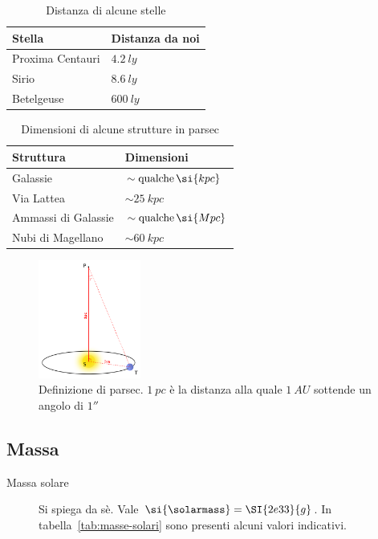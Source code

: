 \begin{table}
\caption{Distanza di alcune stelle}
\label{tab:distanze-stelle}
\centering
\begin{tabular}{ll}
\toprule
Stella & Distanza da noi  \\
\midrule
Proxima Centauri & $\SI{4.2}{ly}$ \\
Sirio            & $\SI{8.6}{ly}$ \\
Betelgeuse       & $\SI{600}{ly}$ \\
\bottomrule
\end{tabular}
\end{table}

\begin{table}
\caption{Dimensioni di alcune strutture in parsec}
\label{tab:distanze-parsec}
\centering
\begin{tabular}{ll}
\toprule
Struttura & Dimensioni \\
\midrule
Galassie          & $\sim \textup{qualche} \, \si{kpc}$ \\
Via Lattea           & $\sim \SI{25}{kpc}$    \\
Ammassi di Galassie            & $\sim \textup{qualche} \, \si{Mpc}$  \\
Nubi di Magellano & $\sim \SI{60}{kpc}$  \\

\bottomrule
\end{tabular}
\end{table}

\begin{figure}
\centering
\includegraphics[width=0.3\textwidth]{immagini/parsec.png}
\caption{Definizione di parsec. $\SI{1}{pc}$ è la distanza alla quale $\SI{1}{AU}$ sottende un angolo di $\ang{;;1}$}
\label{fig:parsec}
\end{figure}

\subsection{Massa}
\begin{description}
    \item[Massa solare] Si spiega da sè. Vale $\si{\solarmass} = \SI{2e33}{g}$. In tabella~\ref{tab:masse-solari} sono presenti alcuni valori indicativi.
\end{description}

